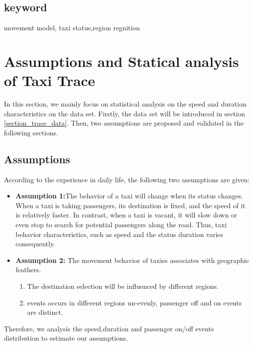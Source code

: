 \documentclass[twocolumn,10pt]{IEEEtran}
\begin{document}
\subsection*{keyword}
movement model, taxi status,region regnition





\section{Assumptions and Statical analysis of Taxi Trace}
\label{section_assumptions_anlysis}

In this section, we mainly focus on statistical analysis on the speed and duration characteristics on the data set.
Firstly, the data set will be introduced in section \ref{section_trace_data}. Then, two assumptions are proposed and validated in the following sections.



\subsection{Assumptions}
\label{section_statistic_analysis}
According to the experience in daily life, the following two assumptions are given:

\begin{itemize}
  \item \textbf{Assumption 1:}The behavior of a taxi will change when its status changes. When a taxi is taking passengers, its destination is fixed, and the speed of it is relatively faster. In contrast, when a taxi is vacant, it will slow down or even stop to search for potential passengers along the road. Thus, taxi behavior characteristics, such as speed and the status duration varies consequently.

  \item \textbf{Assumption 2:} The movement behavior of taxies associates with geographic feathers.
      \begin{enumerate}
        \item The destination selection will be influenced by different regions.
        \item events occurs in different regions un-evenly, passenger off and on events are distinct.
      \end{enumerate}
\end{itemize}


   Therefore, we analysis the speed,duration and passenger on/off events distribution to estimate our assumptions.
\end{document}

